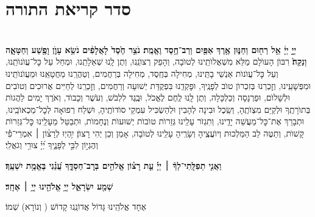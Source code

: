 \chapter[סדר קריאת התורה]{ סדר קריאת התורה }

\longpesicha

\begin{sometimes}

\\
 \textbf{יְיָ֣ יְיָ֔ אֵ֥ל רַח֖וּם וְחַנּ֑וּן אֶ֥רֶךְ אַפַּ֖יִם וְרַב־חֶ֥סֶד וֶאֱמֶֽת׃ נֹצֵ֥ר חֶ֙סֶד֙ לָאֲלָפִ֔ים נֹשֵׂ֥א עָוֺ֛ן וָפֶ֖שַׁע וְחַטָּאָ֑ה וְנַקֵּה֙׃}
רִבּוֺן הָעוׂלָם מַלֵּא מִשְׁאֲלוׂתֵֽינוּ לְטוׂבָה, וְהָפֵק רְצוׂנֵֽנוּ, וְתֶן לָֽנוּ שְׁאֵלָתֵֽנוּ, וּמְחַל עַל כׇּל־עֲוׂנוׂתֵֽנוּ, וְעַל כׇּל־עֲוׂנוׂת אַנְשֵׁי בָתֵּֽינוּ, מְחִילָה בְּחֶֽסֶד, מְחִילָה בְּרַחֲמִים, וְטַהֲרֵֽנוּ מֵחֲטָאֵֽנוּ וּמֵעֲוׂנוׂתֵֽינוּ וּמִפְּשָׁעֵֽינוּ, וְזׇכְרֵנוּ בְּזִכְרוׂן טוׂב לְפָנֶֽיךָ, וּפׇקְדֵֽנוּ בִּפְקֻדַּת יְשׁוּעָה וְרַחֲמִים, וְזׇכְרֵֽנוּ לְחַיִּים אֲרוּכִים וְטוׂבִים וּלְשָׁלוׂם, וּפַרְנָסָה וְכַלְכָּלָה, וְתֶן לָֽנוּ לֶֽחֶם לֶאֱכׂל, וּבֶֽגֶד לִלְבּׂשׁ, וְעׂשֶׁר וְכָבוׂד, וְאׂרֶךְ יָמִים לַהֲגוׂת בְּתוׂרָתֶֽךָ וּלְקַיֵּם מִצְוׂתֶֽהָ, וְשֵֽׂכֶל וּבִינָה לְהָבִין וּלְהַשְׂכִּיל עִמְקֵי סוׂדוׂתֶֽיהָ, וּשְׁלַח רְפוּאָה לְכׇל־מַכְאוׂבֵֽינוּ, וּתְבָרֵךְ אֶת־כׇּל־מַעֲשֵׁה יָדֵֽינוּ, וְתִגְזׂר עָלֵֽינוּ גְּזֵרוׂת טוׂבוׂת יְשׁוּעוׂת וְנֶחָמוׂת, וּתְבַטֵּל מֵעָלֵֽינוּ כׇּל־גְּזֵרוׂת קָשׁוׂת, וְתַטֶּה לֵב הַמַּלְכוּת וְיוׂעֲצֶֽיהָ וְשָׂרֶֽיהָ עָלֵֽינוּ לְטוׂבָה, אָמֵן וְכֵן יְהִי רָצוׂן׃
%
יִ֥הְיֽוּ לְרָצ֨וֹן ׀ אִמְרֵי־פִ֡י וְהֶגְי֣וֹן לִבִּ֣י לְפָנֶ֑יךָ יְ֝יָ֗ צוּרִ֥י וְגֹאֲלִֽי׃


\textbf{וַאֲנִ֤י תְפִלָּֽתִי־לְךָ֨ ׀ יְיָ֡ עֵ֤ת רָצ֗וֹן אֱלֹהִ֥ים בְּרׇב־חַסְדֶּ֑ךָ עֲ֝נֵ֗נִי בֶּאֱמֶ֥ת יִשְׁעֶֽךָ׃ }

\end{sometimes}

\brikhshmei

\textbf{שְׁמַ֖ע יִשְׂרָאֵ֑ל יְיָ֥ אֱלֹהֵ֖ינוּ יְיָ֥ ׀ אֶחָֽד׃}

אֶחָד אֱלֹהֵֽינוּ גָּדוֹל אֲדוֹנֵֽנוּ קָדוֹשׁ ( וְנוֹרָא) שְׁמוֹ׃

\gadlu

\label{al hakol}

